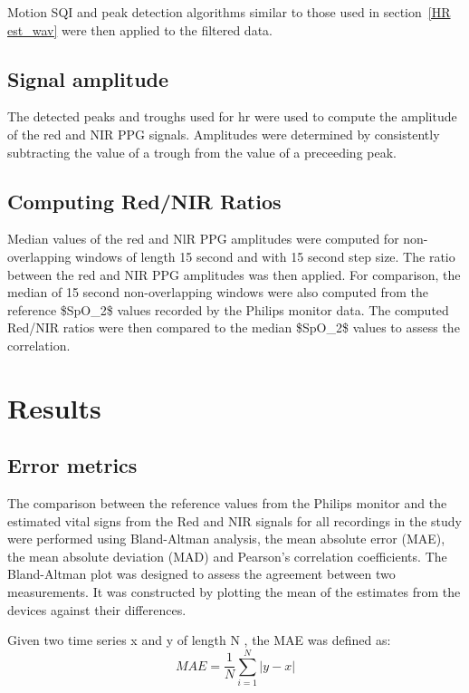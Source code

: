 Motion SQI and peak detection algorithms similar to those used in section~\ref{HR est_wav} were then applied to the filtered data.

\subsection{Signal amplitude}

The detected peaks and troughs used for \gls{hr} were used to compute the amplitude of the red and NIR PPG signals. Amplitudes were determined by consistently subtracting the value of a trough from the value of a preceeding peak.

\subsection{Computing Red/NIR Ratios}

Median values of the red and NlR PPG amplitudes were computed for non-overlapping windows of length 15 second and with 15 second step size. The ratio between the red and NIR PPG amplitudes was then applied.
For comparison, the median of 15 second non-overlapping windows were also computed from the reference \gls{$SpO_2$} values recorded by the Philips monitor data. The computed Red/NIR ratios were then compared to the median \gls{$SpO_2$} values to assess the correlation. 

 \section{Results}
 
 \subsection{Error metrics}
 
The comparison between the reference values from the Philips monitor and the estimated vital signs from the Red and NIR signals for all recordings in the study were performed using Bland-Altman analysis, the mean absolute error (MAE), the mean absolute deviation (MAD) and Pearson's correlation coefficients. The Bland-Altman plot was designed to assess the agreement between two measurements. It was constructed by plotting the mean of the estimates  from the devices against their differences. 

Given two time series x and y of length N , the MAE was defined as:
\begin{equation}
MAE = \frac{1}{N}\sum_{i=1}^{N} |y-x|
\end{equation}

